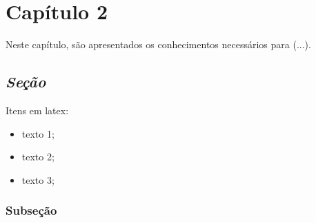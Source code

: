 \chapter[Capítulo 2]{Capítulo 2}
\label{ch:cap2}

Neste capítulo, são apresentados os conhecimentos necessários para (...).

\section[\textit{Seção}]{\textit{Seção}}
\lipsum[1-2]

Itens em latex:
\begin{itemize}
	\item texto 1;
	\item texto 2;
	\item texto 3;
\end{itemize}

\lipsum[2-3]

\subsection{Subseção}

\lipsum[2-4]